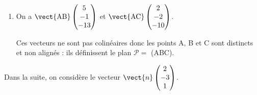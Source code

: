 
\medskip

%
%
%
%
%
%
%
%

\begin{enumerate}
	\item %
On a $\vect{\text{AB}}\begin{pmatrix}5\\-1\\- 13\end{pmatrix}$ et $\vect{\text{AC}}\begin{pmatrix}2\\-2\\- 10\end{pmatrix}$.

Ces vecteurs ne sont pas colinéaires donc les points A, B et C  sont distincts et non alignés : ils définissent le plan $\mathcal{P} = $ (ABC).
\end{enumerate}

Dans la suite, on considère le vecteur $\vect{n} \begin{pmatrix}2\\-3\\1\end{pmatrix}$.

